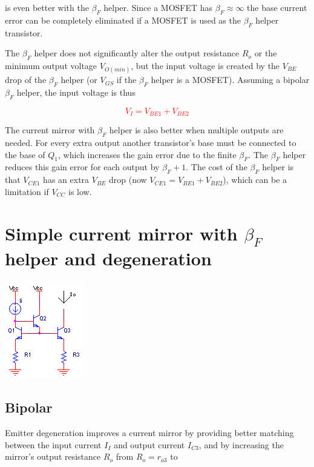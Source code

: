 is even better with the $\beta_{F}$ helper.
Since a MOSFET has $\beta_{F} \approx \infty$ the base current error can be completely eliminated if a MOSFET is used as the $\beta_{F}$ helper transistor.

The $\beta_{F}$ helper does not significantly alter the output resistance $R_{o}$ or the minimum output voltage $V_{O(min)}$, but the input voltage is created by the $V_{BE}$ drop of the $\beta_{F}$ helper (or $V_{GS}$ if the $\beta_{F}$ helper is a MOSFET).
Assuming a bipolar $\beta_{F}$ helper, the input voltage is thus

\textcolor{red}{
\begin{equation}
V_{I} = V_{BE1} + V_{BE2}
\label{eq:currentmirrorbetahelper_Vi}
\end{equation}
}

The current mirror with $\beta_{F}$ helper is also better when multiple outputs are needed.
For every extra output another transistor's base must be connected to the base of $Q_{1}$, which increases the gain error due to the finite $\beta_{F}$.
The $\beta_{F}$ helper reduces this gain error for each output by $\beta_{F}+1$.
The cost of the $\beta_{F}$ helper is that $V_{CE1}$ has an extra $V_{BE}$ drop (now $V_{CE1} = V_{BE1}+V_{BE2}$), which can be a limitation if $V_{CC}$ is low. \autocite[261-262]{analysis-design-analog-ics}

\section{Simple current mirror with $\beta_{F}$ helper and degeneration}
\begin{center}
	\includegraphics{schematics/currentmirror_betahelper_degeneration.PNG}
\end{center}

\subsection{Bipolar}
Emitter degeneration improves a current mirror by providing better matching between the input current $I_{I}$ and output current $I_{C3}$, and by increasing the mirror's output resistance $R_{o}$ from $R_{o} = r_{o3}$ to

